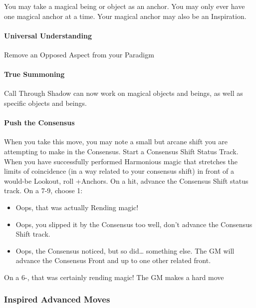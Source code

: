 \documentclass[10pt,twoside,openright]{memoir}
\begin{document}
You may take a magical being or object as an anchor. You may only ever
have one magical anchor at a time. Your magical anchor may also be an
Inspiration.

\hypertarget{universal-understanding}{%
\paragraph{Universal Understanding}\label{universal-understanding}}

Remove an Opposed Aspect from your Paradigm

\hypertarget{true-summoning}{%
\paragraph{True Summoning}\label{true-summoning}}

Call Through Shadow can now work on magical objects and beings, as well
as specific objects and beings.

\hypertarget{push-the-consensus}{%
\paragraph{Push the Consensus}\label{push-the-consensus}}

When you take this move, you may note a small but arcane shift you are
attempting to make in the Consensus. Start a Consensus Shift Status
Track. When you have successfully performed Harmonious magic that
stretches the limits of coincidence (in a way related to your consensus
shift) in front of a would-be Lookout, roll +Anchors. On a hit, advance
the Consensus Shift status track. On a 7-9, choose 1:

\begin{itemize}
\item
  Oops, that was actually Rending magic!
\item
  Oops, you slipped it by the Consensus too well, don't advance the
  Consensus Shift track.
\item
  Oops, the Consensus noticed, but so did\ldots{} something else. The GM
  will advance the Consensus Front and up to one other related front.
\end{itemize}

On a 6-, that was certainly rending magic! The GM makes a hard move

\hypertarget{inspired-advanced-moves}{%
\subsubsection{Inspired Advanced Moves}\label{inspired-advanced-moves}}
\end{document}

